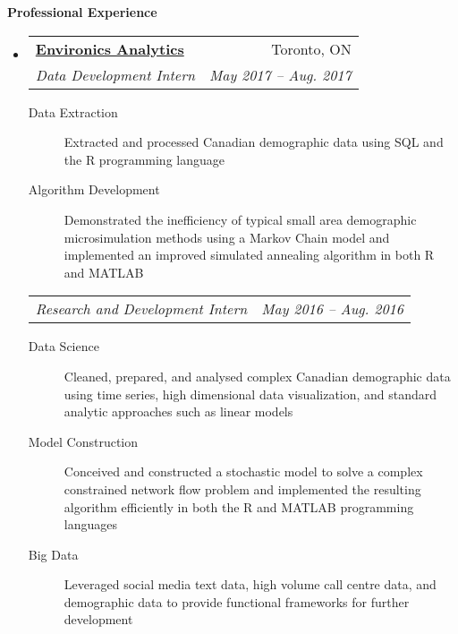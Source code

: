 \documentclass[letterpaper,10pt]{article}
\makeatletter
\newcommand{\resheading}[1]{\colorbox{resBlue}{\begin{minipage}{\textwidth}
			\textbf{#1}
\end{minipage}} \vspace{-14pt}}
\newcommand{\resitem}[4]{\begin{tabular*}{17.5cm}{l@{\extracolsep{\fill}}r} \textbf{#1} & #2 \\ \textit{#3} & \textit{#4} \\ \end{tabular*} \vspace{-6pt}}
\newcommand{\ressubitem}[2]{\begin{tabular*}{17.5cm}{l@{\extracolsep{\fill}}r} \textit{#1} & \textit{#2} \\ \end{tabular*} \vspace{-6pt}}
\makeatother
\begin{document}
\resheading{Professional Experience}
\begin{itemize}
\begin{comment}
\item
	\resitem{\href{https://www.ethz.ch/en.html}{ETH Z\"urich}}{Z\"urich, ZH}{Graduate Teaching Assistant}{Sept. 2018 -- Present}
		{\footnotesize \begin{description}
			\item[Teaching] Assisted in the administration and active instruction of master and bachelor students in the mathematics and computational details of analysis of variance and experimental design in the R programming language
		\end{description} \vspace{-4pt}}
\end{comment}
\item 
	\resitem{\href{https://www.environicsanalytics.com/en-ca/about}{Environics Analytics}}{Toronto, ON}{Data Development Intern}{May 2017 -- Aug. 2017}
		{\footnotesize \begin{description}
				\item[Data Extraction] Extracted and processed Canadian demographic data using SQL and the R programming language
				\item[Algorithm Development] Demonstrated the inefficiency of typical small area demographic microsimulation methods using a Markov Chain model and implemented an improved simulated annealing algorithm in both R and MATLAB
			\end{description} \vspace{-4pt}}
	\ressubitem{Research and Development Intern}{May 2016 -- Aug. 2016}
		{\footnotesize \begin{description}
				\item[Data Science] Cleaned, prepared, and analysed complex Canadian demographic data using time series, high dimensional data visualization, and standard analytic approaches such as linear models
				\item[Model Construction] Conceived and constructed a stochastic model to solve a complex constrained network flow problem and implemented the resulting algorithm efficiently in both the R and MATLAB programming languages
				\item[Big Data] Leveraged social media text data, high volume call centre data, and demographic data to provide functional frameworks for further development

\end{description}}
\end{itemize}
\end{document}
